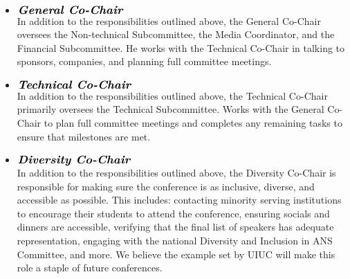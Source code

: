 \begin{itemize}
	\item $\large\textbf{\textit{General Co-Chair}}$\\
	In addition to the responsibilities outlined above, the General Co-Chair oversees the
	Non-technical Subcommittee, the Media Coordinator, and the Financial Subcommittee. He works with the Technical Co-Chair in talking to sponsors, companies, and planning full committee meetings.
	\item $\large\textbf{\textit{Technical Co-Chair}}$\\
	In addition to the responsibilities outlined above, the Technical Co-Chair primarily oversees the
	Technical Subcommittee. Works with the General Co-Chair to plan full committee meetings and completes any remaining tasks to ensure that milestones are met.
	\item $\large\textbf{\textit{Diversity Co-Chair}}$\\
	In addition to the responsibilities outlined above, the Diversity
                Co-Chair is responsible for making sure the conference is as
                inclusive, diverse, and accessible as possible. This includes:
                contacting minority serving institutions to encourage their
                students to attend the conference, ensuring socials and dinners
                are accessible, verifying that the final list of speakers has
                adequate representation, engaging with the national Diversity and
                Inclusion in ANS Committee, and more. We believe the example set
                by UIUC will make this role a staple of future conferences.


\end{itemize}
